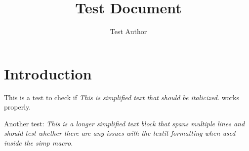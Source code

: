 \documentclass{IEEEtran}
\newcommand{\simp}[1]{\textit{#1}}
\begin{document}
\title{Test Document}
\author{Test Author}
\maketitle

\section{Introduction}
This is a test to check if \simp{This is simplified text that should be italicized.} works properly.

Another test: \simp{This is a longer simplified text block that spans multiple lines and should test whether there are any issues with the textit formatting when used inside the simp macro.}
\end{document}
